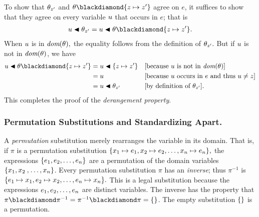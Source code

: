 \documentclass[runningheads]{llncs}
\begin{document}
 To show that $\theta_{z'}$ and $\theta \compose \{\var{z} \mapsto \var{z'}\}$ agree on $e$, it suffices to show that they agree on every variable $u$ that occurs in $e$; that is 
 \begin{align*}
   \var{u} \apply \thet{z'} = \var{u} \apply \theta \compose \{\var{z} \mapsto \var{z'}\}.  
 \end{align*}
 \noindent When $u$ is in $\emph{dom}(\theta),$ the equality follows from the definition of $\theta_{z'}.$  But if $u$ is not in $\emph{dom}(\theta)$, we have
  \begin{align*}
   \var{u} \apply \theta \compose \{\var{z} \mapsto \var{z'}\} 
     & =  \var{u}  \apply \{\var{z} \mapsto \var{z'}\}   && \text{[because  $\var{u}$ is not in $\dom(\theta)$]} \\
     & = \var{u}                                         &&\text{[because $\var{u}$ occurs in $e$  and thus $\var{u} \neq \var{z}$]} \\
     & = \var{u} \apply \thet{z'} && \text{[by definition of $\thet{z'}$].}
 \end{align*}
This completes the proof of the \emph{derangement property}.
 
 




\subsubsection{Permutation Substitutions and Standardizing Apart.} A \emph{permutation} substitution merely rearranges the variable in its domain. That is, if $\pi$ is a permutation substitution  
 $\{{x}_{1} \mapsto e_{1}, {x}_{2} \mapsto e_{2}, \ldots, {x}_{n} \mapsto e_{n}\},$ the expressions $\{e_{1}, e_{2}, \ldots, e_{n}\}$ are a permutation of the domain variables $\{{x}_{1},{x}_{2}\mathbin{,}  \ldots,  {x}_{n}\}$. 
Every  permutation substitution $\pi$ has an \emph{inverse}; thus $\pi^{-1}$ is 
 $\{e_{1} \mapsto {x}_{1}, e_{2} \mapsto {x}_{2}, \ldots, e_{n} \mapsto {x}_{n}\}.$ 
 This is a legal substitution because the expressions $e_{1}, e_{2}, \ldots, e_{n}$ are distinct variables. The inverse has the property that $\pi \compose \pi^{-1} = \pi^{-1} \compose \pi = \emptysubst$.  The empty substitution $\{\}$ is a permutation.
 
\end{document}
